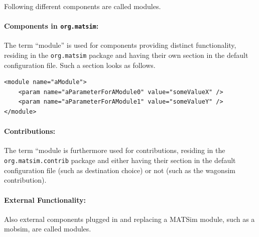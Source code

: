 Following different components are called modules.

\paragraph{Components in \lstinline|org.matsim|:} %
The term ``module'' is used for components providing distinct functionality, residing in the \lstinline|org.matsim| package and having their own section in the default configuration file. Such a section looks as follows.
\begin{lstlisting}
<module name="aModule">
    <param name="aParameterForAModule0" value="someValueX" />
    <param name="aParameterForAModule1" value="someValueY" />
</module>
\end{lstlisting}

\paragraph{Contributions:} %
The term ``module is furthermore used for contributions, residing in the \lstinline|org.matsim.contrib| package and either having their section in the default configuration file (such as destination choice) or not (such as the wagonsim contribution).






\paragraph{External Functionality:} %
Also external components plugged in and replacing a MATSim module, such as a mobsim, are called modules.

